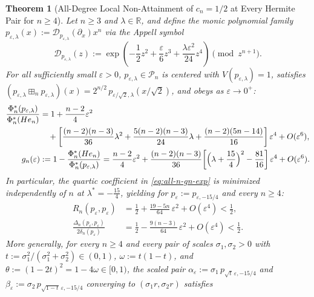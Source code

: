 \documentclass[11pt,a4paper]{article}
\newtheorem{theorem}{Theorem}[section]
\theoremstyle{definition}
\newcommand{\R}{\mathbb{R}}
\newcommand{\boxplusn}{\boxplus_n}
\begin{document}
\begin{theorem}[All-Degree Local Non-Attainment of $c_n = 1/2$ at Every Hermite Pair for $n \ge 4$]
\label{thm:local-nonattainment}
Let $n \ge 3$ and $\lambda \in \R$, and define the monic polynomial family $p_{\varepsilon,\lambda}(x) := \mathcal{D}_{p_{\varepsilon,\lambda}}(\partial_x) x^n$ via the Appell symbol
\[
\mathcal{D}_{p_{\varepsilon,\lambda}}(z) := \exp\!\left(-\frac{1}{2}z^2 + \frac{\varepsilon}{6}z^3 + \frac{\lambda\varepsilon^2}{24}z^4\right) \pmod{z^{n+1}}.
\]
For all sufficiently small $\varepsilon > 0$, $p_{\varepsilon,\lambda} \in \mathcal{P}_n$ is centered with $V(p_{\varepsilon,\lambda}) = 1$, satisfies $(p_{\varepsilon,\lambda} \boxplusn p_{\varepsilon,\lambda})(x) = 2^{n/2}\,p_{\varepsilon/\sqrt{2},\lambda}(x/\sqrt{2})$, and obeys as $\varepsilon \to 0^+$:
\begin{align}
\label{eq:all-n-phi-exp}
\frac{\Phi_n^*(p_{\varepsilon,\lambda})}{\Phi_n^*(He_n)}
&= 1 + \frac{n-2}{4}\varepsilon^2 \nonumber \\
&\quad + \left[\frac{(n-2)(n-3)}{36}\lambda^2 + \frac{5(n-2)(n-3)}{24}\lambda + \frac{(n-2)(5n-14)}{16}\right]\varepsilon^4
+ O(\varepsilon^6), \\
\label{eq:all-n-gn-exp}
g_n(\varepsilon) &:= 1 - \frac{\Phi_n^*(He_n)}{\Phi_n^*(p_{\varepsilon,\lambda})}
= \frac{n-2}{4}\varepsilon^2
+ \frac{(n-2)(n-3)}{36}\!\left[\Bigl(\lambda + \frac{15}{4}\Bigr)^2 - \frac{81}{16}\right]\varepsilon^4
+ O(\varepsilon^6).
\end{align}
In particular, the quartic coefficient in \eqref{eq:all-n-gn-exp} is minimized independently of $n$ at $\lambda^* = -\frac{15}{4}$, yielding for $p_\varepsilon := p_{\varepsilon,-15/4}$ and every $n \ge 4$:
\begin{align*}
R_n(p_\varepsilon, p_\varepsilon)
&= \frac{1}{2} + \frac{19 - 5n}{64}\,\varepsilon^2 + O(\varepsilon^4) < \frac{1}{2}, \\
\frac{\Delta_n(p_\varepsilon, p_\varepsilon)}{2\delta_n(p_\varepsilon)}
&= \frac{1}{2} - \frac{9(n - 3)}{64}\,\varepsilon^2 + O(\varepsilon^4) < \frac{1}{2}.
\end{align*}
More generally, for every $n \ge 4$ and every pair of scales $\sigma_1, \sigma_2 > 0$ with $t := \sigma_1^2/(\sigma_1^2+\sigma_2^2) \in (0,1)$, $\omega := t(1-t)$, and $\theta := (1-2t)^2 = 1-4\omega \in [0,1)$, the scaled pair $\alpha_\varepsilon := \sigma_1\, p_{\sqrt{t}\,\varepsilon,-15/4}$ and $\beta_\varepsilon := \sigma_2\, p_{\sqrt{1-t}\,\varepsilon,-15/4}$ converging to $(\sigma_1 r, \sigma_2 r)$ satisfies

\end{theorem}
\end{document}
